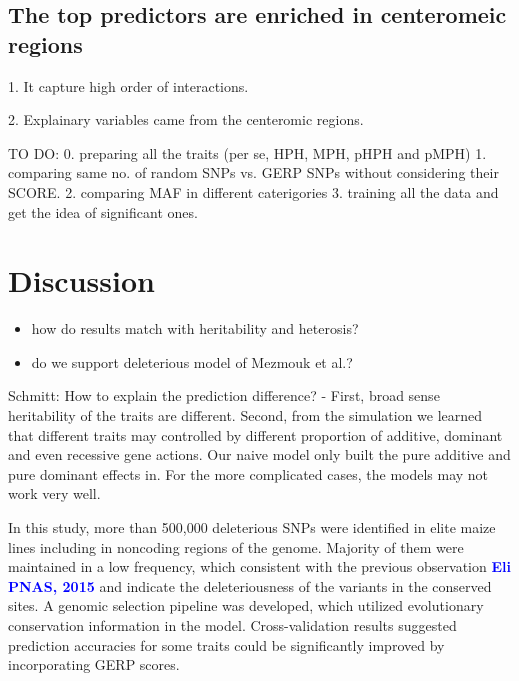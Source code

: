\documentclass[9pt,twocolumn,twoside]{gsajnl}
\newcommand{\yang}[1]{\textcolor{blue}{\bf #1}}
\begin{document}
\subsection*{The top predictors are enriched in centeromeic regions}

1. It capture high order of interactions.  

2. Explainary variables came from the centeromic regions.

TO DO:
0. preparing all the traits (per se, HPH, MPH, pHPH and pMPH)
1. comparing same no. of random SNPs vs. GERP SNPs without considering their SCORE.
2. comparing MAF in different caterigories
3. training all the data and get the idea of significant ones.



\section*{Discussion}

\begin{itemize}
  \item how do results match with heritability and heterosis?
  \item do we support deleterious model of Mezmouk et al.?
\end{itemize}

Schmitt: How to explain the prediction difference?  
- First, broad sense heritability of the traits are different. Second, from the simulation we learned that different traits may controlled by different proportion of additive, dominant and even recessive gene actions. Our naive model only built the pure additive and pure dominant effects in. For the more complicated cases, the models may not work very well.

In this study, more than 500,000 deleterious SNPs were identified in elite maize lines including in noncoding regions of the genome. Majority of them were maintained in a low frequency, which consistent with the previous observation \yang{Eli PNAS, 2015} and indicate the deleteriousness of the variants in the conserved sites. A genomic selection pipeline was developed, which utilized evolutionary conservation information in the model.
Cross-validation results suggested prediction accuracies for some traits could be significantly improved by incorporating GERP scores. 


\end{document}
